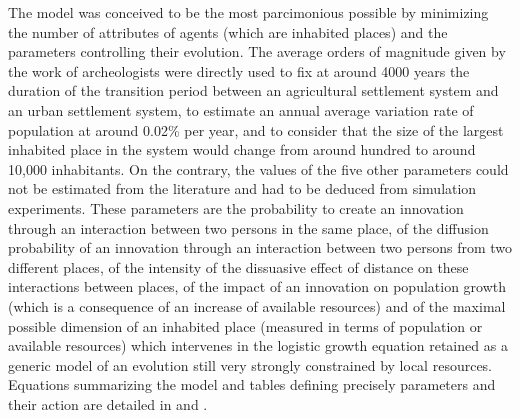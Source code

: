 \documentclass[10pt]{article}
\begin{document}
The model was conceived to be the most parcimonious possible by minimizing the number of attributes of agents (which are inhabited places) and the parameters controlling their evolution. The average orders of magnitude given by the work of archeologists were directly used to fix at around 4000 years the duration of the transition period between an agricultural settlement system and an urban settlement system, to estimate an annual average variation rate of population at around 0.02\% per year, and to consider that the size of the largest inhabited place in the system would change from around hundred to around 10,000 inhabitants. On the contrary, the values of the five other parameters could not be estimated from the literature and had to be deduced from simulation experiments. These parameters are the probability to create an innovation through an interaction between two persons in the same place, of the diffusion probability of an innovation through an interaction between two persons from two different places, of the intensity of the dissuasive effect of distance on these interactions between places, of the impact of an innovation on population growth (which is a consequence of an increase of available resources) and of the maximal possible dimension of an inhabited place (measured in terms of population or available resources) which intervenes in the logistic growth equation retained as a generic model of an evolution still very strongly constrained by local resources. Equations summarizing the model and tables defining precisely parameters and their action are detailed in \cite{schmitt2014modelisation} and \cite{pumain2017urban}.
\end{document}
